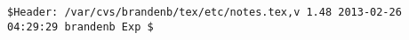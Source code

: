 \documentclass{article}
\begin{document}


\begin{thebibliography}{}


\end{thebibliography}

\vfill\bigskip\noindent\tiny\begin{verbatim}
$Header: /var/cvs/brandenb/tex/etc/notes.tex,v 1.48 2013-02-26 04:29:29 brandenb Exp $
\end{verbatim}
\end{document}
